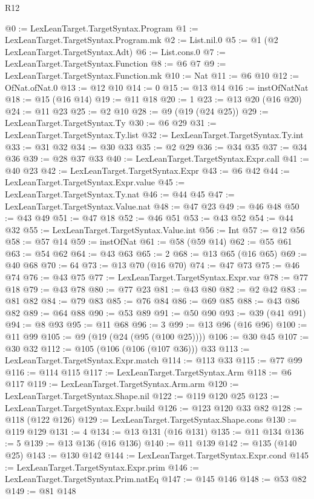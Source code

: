 \begin{lexlean}{R12}
\begin{coremodule}
@0 := LexLeanTarget.TargetSyntax.Program
@1 := LexLeanTarget.TargetSyntax.Program.mk
@2 := List.nil.{0}
@5 := @1 (@2 LexLeanTarget.TargetSyntax.Adt)
@6 := List.cons.{0}
@7 := LexLeanTarget.TargetSyntax.Function
@8 := @6 @7
@9 := LexLeanTarget.TargetSyntax.Function.mk
@10 := Nat
@11 := @6 @10
@12 := OfNat.ofNat.{0}
@13 := @12 @10
@14 := 0
@15 := @13 @14
@16 := instOfNatNat
@18 := @15 (@16 @14)
@19 := @11 @18
@20 := 1
@23 := @13 @20 (@16 @20)
@24 := @11 @23
@25 := @2 @10
@28 := @9 (@19 (@24 @25))
@29 := LexLeanTarget.TargetSyntax.Ty
@30 := @6 @29
@31 := LexLeanTarget.TargetSyntax.Ty.list
@32 := LexLeanTarget.TargetSyntax.Ty.int
@33 := @31 @32
@34 := @30 @33
@35 := @2 @29
@36 := @34 @35
@37 := @34 @36
@39 := @28 @37 @33
@40 := LexLeanTarget.TargetSyntax.Expr.call
@41 := @40 @23
@42 := LexLeanTarget.TargetSyntax.Expr
@43 := @6 @42
@44 := LexLeanTarget.TargetSyntax.Expr.value
@45 := LexLeanTarget.TargetSyntax.Ty.nat
@46 := @44 @45
@47 := LexLeanTarget.TargetSyntax.Value.nat
@48 := @47 @23
@49 := @46 @48
@50 := @43 @49
@51 := @47 @18
@52 := @46 @51
@53 := @43 @52
@54 := @44 @32
@55 := LexLeanTarget.TargetSyntax.Value.int
@56 := Int
@57 := @12 @56
@58 := @57 @14
@59 := instOfNat
@61 := @58 (@59 @14)
@62 := @55 @61
@63 := @54 @62
@64 := @43 @63
@65 := 2
@68 := @13 @65 (@16 @65)
@69 := @40 @68
@70 := 64
@73 := @13 @70 (@16 @70)
@74 := @47 @73
@75 := @46 @74
@76 := @43 @75
@77 := LexLeanTarget.TargetSyntax.Expr.var
@78 := @77 @18
@79 := @43 @78
@80 := @77 @23
@81 := @43 @80
@82 := @2 @42
@83 := @81 @82
@84 := @79 @83
@85 := @76 @84
@86 := @69 @85
@88 := @43 @86 @82
@89 := @64 @88
@90 := @53 @89
@91 := @50 @90
@93 := @39 (@41 @91)
@94 := @8 @93
@95 := @11 @68
@96 := 3
@99 := @13 @96 (@16 @96)
@100 := @11 @99
@105 := @9 (@19 (@24 (@95 (@100 @25))))
@106 := @30 @45
@107 := @30 @32
@112 := @105 (@106 (@106 (@107 @36))) @33
@113 := LexLeanTarget.TargetSyntax.Expr.match
@114 := @113 @33
@115 := @77 @99
@116 := @114 @115
@117 := LexLeanTarget.TargetSyntax.Arm
@118 := @6 @117
@119 := LexLeanTarget.TargetSyntax.Arm.arm
@120 := LexLeanTarget.TargetSyntax.Shape.nil
@122 := @119 @120 @25
@123 := LexLeanTarget.TargetSyntax.Expr.build
@126 := @123 @120 @33 @82
@128 := @118 (@122 @126)
@129 := LexLeanTarget.TargetSyntax.Shape.cons
@130 := @119 @129
@131 := 4
@134 := @13 @131 (@16 @131)
@135 := @11 @134
@136 := 5
@139 := @13 @136 (@16 @136)
@140 := @11 @139
@142 := @135 (@140 @25)
@143 := @130 @142
@144 := LexLeanTarget.TargetSyntax.Expr.cond
@145 := LexLeanTarget.TargetSyntax.Expr.prim
@146 := LexLeanTarget.TargetSyntax.Prim.natEq
@147 := @145 @146
@148 := @53 @82
@149 := @81 @148

\end{coremodule}
\end{lexlean}
